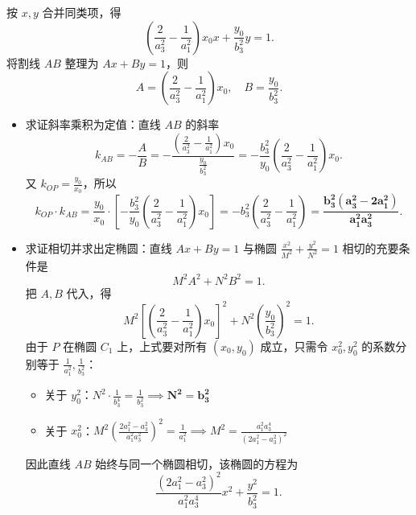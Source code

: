 \begin{solution}
按 $x,y$ 合并同类项，得
$$\left( \frac{2}{a_3^2} - \frac{1}{a_1^2} \right) x_0 x + \frac{y_0}{b_3^2} y = 1.$$
将割线 $AB$ 整理为 $Ax + By = 1$，则
$$A = \left( \frac{2}{a_3^2} - \frac{1}{a_1^2} \right) x_0, \quad B = \frac{y_0}{b_3^2}.$$
\begin{itemize}
\item 求证斜率乘积为定值：直线 $AB$ 的斜率
$$k_{AB} = -\frac{A}{B} = -\frac{\left( \frac{2}{a_3^2} - \frac{1}{a_1^2} \right) x_0}{\frac{y_0}{b_3^2}} = - \frac{b_3^2}{y_0} \left( \frac{2}{a_3^2} - \frac{1}{a_1^2} \right) x_0.$$
又 $k_{OP} = \frac{y_0}{x_0}$，所以
$$k_{OP} \cdot k_{AB} = \frac{y_0}{x_0} \cdot \left[ - \frac{b_3^2}{y_0} \left( \frac{2}{a_3^2} - \frac{1}{a_1^2} \right) x_0 \right] = - b_3^2 \left( \frac{2}{a_3^2} - \frac{1}{a_1^2} \right) = \mathbf{\frac{b_3^2(a_3^2 - 2a_1^2)}{a_1^2 a_3^2}}.$$
\item 求证相切并求出定椭圆：直线 $Ax + By = 1$ 与椭圆 $\frac{x^2}{M^2} + \frac{y^2}{N^2} = 1$ 相切的充要条件是
$$M^2 A^2 + N^2 B^2 = 1.$$
把 $A,B$ 代入，得
\[M^2 \left[ \left( \frac{2}{a_3^2} - \frac{1}{a_1^2} \right) x_0 \right]^2 + N^2 \left( \frac{y_0}{b_3^2} \right)^2 = 1.\]
由于 $P$ 在椭圆 $C_1$ 上，上式要对所有 $(x_0,y_0)$ 成立，只需令 $x_0^2,y_0^2$ 的系数分别等于 $\frac{1}{a_1^2},\frac{1}{b_3^2}$：
\begin{itemize}
\item 关于 $y_0^2$：$N^2 \cdot \frac{1}{b_3^4} = \frac{1}{b_3^2} \implies \mathbf{N^2 = b_3^2}$
\item 关于 $x_0^2$：$M^2 \left( \frac{2a_1^2 - a_3^2}{a_1^2 a_3^2} \right)^2 = \frac{1}{a_1^2} \implies {M^2 = \frac{a_1^2 a_3^4}{(2a_1^2 - a_3^2)^2}}$
\end{itemize}
因此直线 $AB$ 始终与同一个椭圆相切，该椭圆的方程为
$${\frac{(2a_1^2 - a_3^2)^2}{a_1^2 a_3^4} x^2 + \frac{y^2}{b_3^2} = 1}.$$
\end{itemize}
\end{solution}

